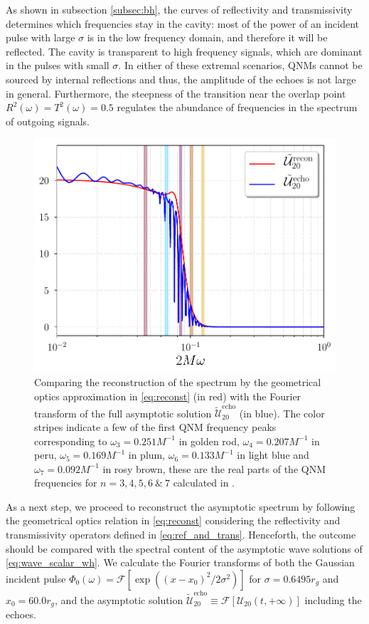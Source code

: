 \documentclass[article,aps,nofootinbib,twocolumn,superscriptaddress]{revtex4-1}
\begin{document}
As shown in subsection \ref{subsec:bh}, the curves of reflectivity and transmissivity determines which frequencies stay in the cavity: most of the power of an incident pulse with large $\sigma$ is in the low frequency domain, and therefore it will be reflected. The cavity is transparent to high frequency signals, which are dominant in the pulses with small $\sigma$. In either of these extremal scenarios, QNMs cannot be sourced by internal reflections and thus, the amplitude of the echoes is not large in general. Furthermore, the steepness of the transition near the overlap point $R^2(\omega)=T^2(\omega)=0.5$ regulates the abundance of frequencies in the spectrum of outgoing signals.\\
 
\begin{figure}[t!]
\centering
\includegraphics[width=.45\textwidth]{figures/Reconst_omega_scalar.pdf}
\caption{\label{fig:rec_scalar} Comparing the reconstruction of the spectrum by the geometrical optics approximation in \eqref{eq:reconst} (in red) with the Fourier transform of the full asymptotic solution $\tilde{\mathcal{U}}_{20}^{\mathrm{echo}}$ (in blue). The color stripes indicate a few of the first QNM frequency peaks corresponding to $\omega_3=0.251M^{-1}$ in golden rod, $\omega_4=0.207M^{-1}$ in peru, $\omega_5=0.169M^{-1}$ in plum, $\omega_6=0.133M^{-1}$ in light blue and $\omega_7=0.092M^{-1}$ in rosy brown, these are the real parts of the QNM frequencies for $n=3,4,5,6~\&~7$ calculated in \citep{PhysRevD.46.4179}.}
\end{figure} 

As a next step, we proceed to reconstruct the asymptotic spectrum by following the geometrical optics relation in \eqref{eq:reconst} considering the reflectivity and transmissivity operators defined in \eqref{eq:ref_and_trans}. Henceforth, the outcome should be compared with the spectral content of the asymptotic wave solutions of \eqref{eq:wave_scalar_wh}. We calculate the Fourier transforms of both the Gaussian incident pulse $\Phi_0(\omega)=\mathcal{F}[\exp\left((x-x_0)^2/2\sigma^2\right)]$ for $\sigma=0.6495r_g$ and $x_0=60.0r_g$, and the asymptotic solution $\tilde{\mathcal{U}}_{20}^{\mathrm{echo}}\equiv\mathcal{F}[\mathcal{U}_{20}(t,+\infty)]$ including the echoes.\\
\end{document}
